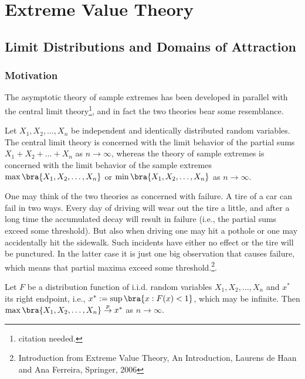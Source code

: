 \chapter{Extreme Value Theory}

\section{Limit Distributions and Domains of Attraction}

\subsection{Motivation}

The asymptotic theory of sample extremes has been developed in parallel with the central limit theory\footnote{citation needed.}, and in fact the two theories bear some resemblance.

Let $X_1, X_2, \dots, X_n$ be independent and identically distributed random variables. The central limit theory is concerned with the limit behavior of the partial sums $X_1 + X_2 +\dots+ X_n$ as $n \to \infty$, whereas the theory of sample extremes is concerned with the limit behavior of the sample extremes $\max\bra{X_1, X_2,\dots, X_n}$ or $\min\bra{X_1,X_2,\dots,X_n}$ as $n\to \infty$.

One may think of the two theories as concerned with failure. A tire of a car can fail in two ways. Every day of driving will wear out the tire a little, and after a long time the accumulated decay will result in failure (i.e., the partial sums exceed some threshold). But also when driving one may hit a pothole or one may accidentally hit the sidewalk. Such incidents have either no effect or the tire will be punctured. In the latter case it is just one big observation that causes failure, which means that partial maxima exceed some threshold.\footnote{Introduction from Extreme Value Theory, An Introduction, Laurens de Haan and Ana Ferreira, Springer, 2006}.

\begin{lemma}
Let $F$ be a distribution function of i.i.d. random variables $X_1,X_2,\dots,X_n$ and $x^*$ its right endpoint, i.e., $x^* := \sup\bra{x:F(x)<1}$, which may be infinite. Then $\max\bra{X_1,X_2,\dots, X_n} \stackrel{p}{\to} x^*$ as $n\to \infty$.
\end{lemma}

